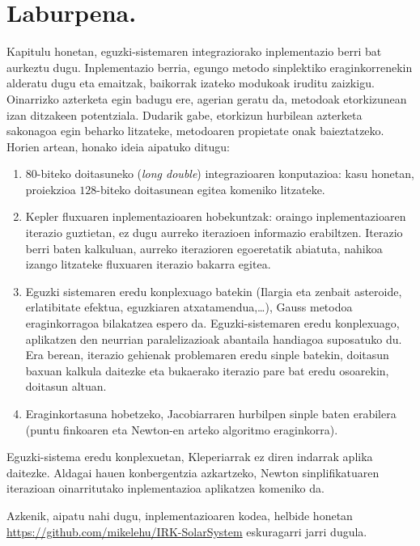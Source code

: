 \section{Laburpena.}


Kapitulu honetan, eguzki-sistemaren integraziorako inplementazio berri bat aurkeztu dugu. Inplementazio berria, egungo metodo sinplektiko eraginkorrenekin alderatu dugu eta emaitzak, baikorrak izateko modukoak iruditu zaizkigu. Oinarrizko azterketa egin badugu ere, agerian geratu da, metodoak etorkizunean izan ditzakeen potentziala. Dudarik gabe, etorkizun hurbilean azterketa sakonagoa egin beharko litzateke, metodoaren propietate onak baieztatzeko. Horien artean, honako ideia aipatuko ditugu:
\begin{enumerate}
\item $80$-biteko doitasuneko (\emph{long double}) integrazioaren konputazioa: kasu honetan, proiekzioa $128$-biteko doitasunean egitea komeniko litzateke. 
\item Kepler fluxuaren inplementazioaren hobekuntzak: oraingo inplementazioaren iterazio guztietan, ez dugu aurreko iterazioen informazio erabiltzen. Iterazio berri baten kalkuluan, aurreko iterazioren egoeretatik abiatuta, nahikoa izango litzateke fluxuaren iterazio bakarra egitea.  
\item Eguzki sistemaren eredu konplexuago batekin (Ilargia eta zenbait asteroide, erlatibitate efektua, eguzkiaren atxatamendua,\dots), Gauss metodoa eraginkorragoa bilakatzea espero da. Eguzki-sistemaren eredu konplexuago, aplikatzen den neurrian paralelizazioak abantaila handiagoa suposatuko du. Era berean, iterazio gehienak problemaren eredu sinple batekin, doitasun baxuan kalkula daitezke eta bukaerako iterazio pare bat eredu osoarekin, doitasun altuan.
\item Eraginkortasuna hobetzeko, Jacobiarraren hurbilpen sinple baten erabilera (puntu finkoaren eta Newton-en arteko algoritmo eraginkorra).  
\end{enumerate}    

Eguzki-sistema eredu konplexuetan, Kleperiarrak ez diren indarrak aplika daitezke. Aldagai hauen konbergentzia azkartzeko, Newton sinplifikatuaren iterazioan oinarritutako inplementazioa aplikatzea komeniko da.  

Azkenik, aipatu nahi dugu, inplementazioaren kodea, helbide honetan \url{https://github.com/mikelehu/IRK-SolarSystem} eskuragarri jarri dugula. 

